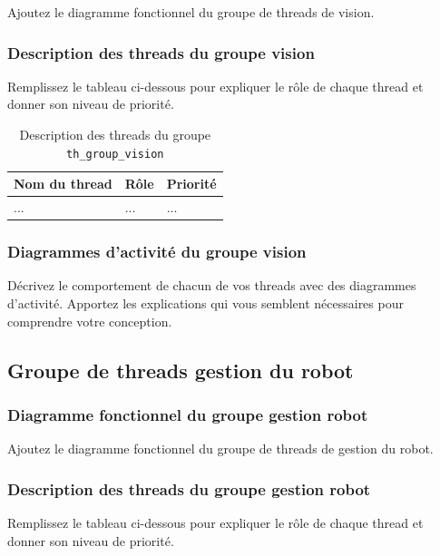 \documentclass[11pt, a4paper]{paper}
\begin{document}
{\color{blue} Ajoutez le diagramme fonctionnel du groupe de threads de vision.}

\subsubsection{Description des threads du groupe vision}
{\color{red} Remplissez le tableau ci-dessous pour expliquer le rôle de chaque thread et donner son niveau de priorité.}


\begin{table}[htp]
\caption{Description des threads du groupe {\tt th\_group\_vision}}
\begin{center}
\begin{tabular}{|p{3cm}|p{8.5cm}|p{2cm}|}
\hline
\bf Nom du thread &	\bf Rôle &	\bf Priorité \\
\hline
\hline
\color{blue}... &	\color{blue}... &	\color{blue}...\\
\hline
\end{tabular}
\end{center}
\label{tab:gt_moniteur}
\end{table}%
\FloatBarrier

\subsubsection{Diagrammes d'activité du groupe vision}
{\color{blue}Décrivez le comportement de chacun de vos threads avec des diagrammes d'activité. Apportez les explications qui vous semblent nécessaires pour comprendre votre conception.}


\subsection{Groupe de threads gestion du robot}

\subsubsection{Diagramme fonctionnel du groupe gestion robot}
{\color{blue} Ajoutez le diagramme fonctionnel du groupe de threads de gestion du robot.}

\subsubsection{Description des threads du groupe gestion robot}
{\color{red} Remplissez le tableau ci-dessous pour expliquer le rôle de chaque thread et donner son niveau de priorité.}
\end{document}
